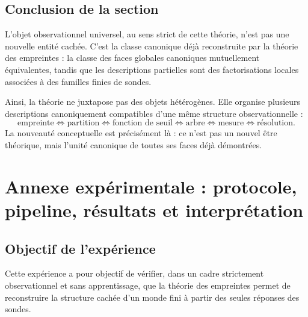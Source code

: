 \documentclass[11pt,a4paper]{article}
\begin{document}
\begin{appendices}
\subsection{Conclusion de la section}

L'objet observationnel universel, au sens strict de cette théorie, n'est pas une nouvelle entité cachée.  
C'est la classe canonique déjà reconstruite par la théorie des empreintes : la classe des faces globales canoniques mutuellement équivalentes, tandis que les descriptions partielles sont des factorisations locales associées à des familles finies de sondes.

Ainsi, la théorie ne juxtapose pas des objets hétérogènes. Elle organise plusieurs descriptions canoniquement compatibles d'une même structure observationnelle :
\[
\text{empreinte}
\Longleftrightarrow
\text{partition}
\Longleftrightarrow
\text{fonction de seuil}
\Longleftrightarrow
\text{arbre}
\Longleftrightarrow
\text{mesure}
\Longleftrightarrow
\text{résolution}.
\]
La nouveauté conceptuelle est précisément là : ce n'est pas un nouvel être théorique, mais l'unité canonique de toutes ses faces déjà démontrées.














\section{Annexe expérimentale : protocole, pipeline, résultats et interprétation}

\subsection{Objectif de l'expérience}

Cette expérience a pour objectif de vérifier, dans un cadre strictement observationnel et sans apprentissage, que la théorie des empreintes permet de reconstruire la structure cachée d'un monde fini à partir des seules réponses des sondes.


\end{appendices}
\end{document}
